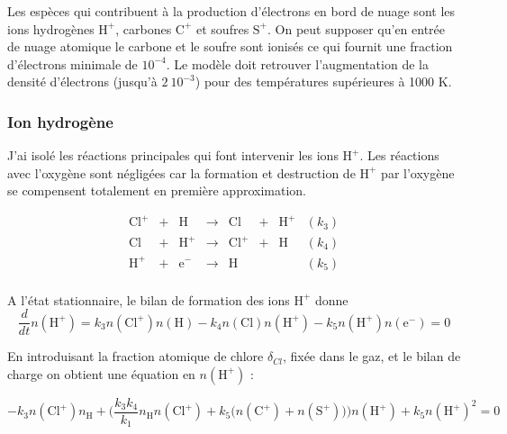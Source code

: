 Les espèces qui contribuent à la production d'électrons en bord de nuage sont les ions hydrogènes $\mathrm{H}^+$, carbones $\mathrm{C}^+$ et soufres $\mathrm{S}^+$. On peut supposer qu'en entrée de nuage atomique le carbone et le soufre sont ionisés ce qui fournit une fraction d'électrons minimale de $10^{-4}$. Le modèle doit retrouver l'augmentation de la densité d'électrons (jusqu'à $2\ 10^{-3}$) pour des températures supérieures à 1000 K.
 
\subsubsection{Ion hydrogène}

J'ai isolé les réactions principales qui font intervenir les ions $\mathrm{H}^+$. Les réactions avec l'oxygène sont négligées car la formation et destruction de $\mathrm{H}^+$ par l'oxygène se compensent totalement en première approximation. 

\begin{equation}
    \begin{array}{lccccclr}
        \mathrm{Cl}^+ & + &\mathrm{H}   & \rightarrow &\mathrm{Cl}  & + & \mathrm{H}^+ & (k_3) \\
        \mathrm{Cl}  & + & \mathrm{H}^+  & \rightarrow & \mathrm{Cl}^+ & + &\mathrm{H}  & (k_4) \\
        \mathrm{H}^+  & + & \mathrm{e}^-  & \rightarrow &\mathrm{H}   &   &     & (k_5) \\
    \end{array}
\end{equation}

A l'état stationnaire, le bilan de formation des ions $\mathrm{H}^+$ donne
\begin{equation}\label{eq:h+}
    \frac{d}{dt}n(\mathrm{H}^+) = k_3n(\mathrm{Cl}^+)n(\mathrm{H}) - k_4n(\mathrm{Cl})n(\mathrm{H}^+) - k_5 n(\mathrm{H}^+)n(\mathrm{e}^-) = 0
\end{equation}

En introduisant la fraction atomique de chlore $\delta_{Cl}$, fixée dans le gaz, et le bilan de charge on obtient une équation en $n(\mathrm{H}^+)$ :

\begin{equation}
    -k_3n(\mathrm{Cl}^+)n_{\mathrm{H}} + \bigg( \frac{k_3 k_4}{k_1} n_{\mathrm{H}} n(\mathrm{Cl}^+) + k_5 \big(n(\mathrm{C}^+)+ n(\mathrm{S}^+)\big) \bigg) n(\mathrm{H}^+) + k_5 n(\mathrm{H}^+)^2 = 0
\end{equation}

